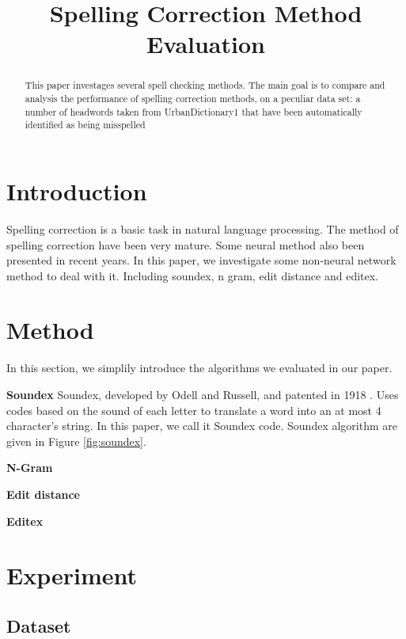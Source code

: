 \documentclass[11pt]{article}
\title{Spelling Correction Method Evaluation}
\begin{document}
\maketitle


\begin{abstract}

This paper investages several spell checking methods. The main goal is to compare and analysis the performance of spelling correction methods,  on a peculiar data set: a number of headwords taken from UrbanDictionary1 that have been automatically identified as being misspelled \cite{}

\end{abstract}

\section{Introduction}

Spelling correction is a basic task in natural language processing. The method of spelling correction have been very mature. Some neural method also been presented in recent years. In this paper, we investigate some non-neural network method to deal with it. Including soundex, n gram, edit distance and editex.


\section{Method}

In this section, we simplily introduce the algorithms we evaluated in our paper. 

\noindent\textbf{Soundex} Soundex, developed by Odell and Russell, and patented in 1918 \cite{bibid}. Uses codes based on the sound of each letter to translate a word into an at most 4 character's string. In this paper, we call it Soundex code. Soundex algorithm are given in Figure \ref{fig:soundex}.

\noindent\textbf{N-Gram} 

\noindent\textbf{Edit distance}

\noindent\textbf{Editex}


\section{Experiment}

\subsection{Dataset} 
\end{document}
